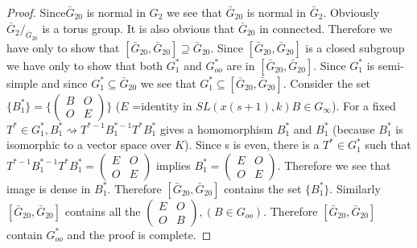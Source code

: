  \begin{proof}
   Since\pageoriginale $\bar{G}_{20}$ is normal in $G_2$ we see
   that  $\bar{G}_{20}$ is normal in  
   $\bar{G}_{2}$. Obviously $\bar{G}_{2} /
   _{\bar{G}_{20}}$ is a torus group. It is also obvious that
   $\bar{G}_{20}$ in connected. Therefore we have only to show
   that $[\bar{G}_{20},\bar{G}_{20}]\supseteq
   \bar{G}_{20}$. Since
   $[\bar{G}_{20},\bar{G}_{20}]$ is a closed subgroup we
   have only to show that both $G^*_1$  and $G^*_{oo}$ are in
   $[\bar{G}_{20},\bar{G}_{20}]$. Since $G^*_1$ is
   semi-simple and since $G^*_1 \subseteq \bar{G}_{20}$ we see that $G^*_1
   \subseteq [\bar{G}_{20},\bar{G}_{20}]$. Consider the
   set $\{B^*_1\}= \bigg\{\begin{pmatrix} B & O\\ O& E \end{pmatrix}
   \bigg \}$ ($E$ =identity in $SL (x(s+1),k) B \in G_{\infty}$). For a
   fixed $T^* \in G^*_1, B^*_1 \rightsquigarrow T^{*-1} B^{*-1}_1
   T^* B^*_1$ gives a homomorphism $B^*_1$ and $B^*_1$ (because
   $B^*_1$ is isomorphic to a vector space over $K$). Since s is even,
   there is a $T^* \in G^*_1$ such that $T^{*-1} B^{*-{1}}_1 T^*
   B^*_1= \begin{pmatrix} E& O\\ O& E \end{pmatrix}$ implies
   $B^*_1= \begin{pmatrix} E& O\\ O& E \end{pmatrix}$. Therefore we
   see that image is dense in $B^*_1$. Therefore
   $[\bar{G}_{20},\bar{G}_{20}]$ contains the set
   $\{B^*_1\}$. Similarly $[\bar{G}_{20},\bar{G}_{20}]$
   contains all the $\begin{pmatrix} E& O\\ O& B \end{pmatrix},(B \in
   G_{oo})$. Therefore $[\bar{G}_{20},\bar{G}_{20}]$
   contain $G^*_{oo}$ and the proof is complete. 
 \end{proof}
